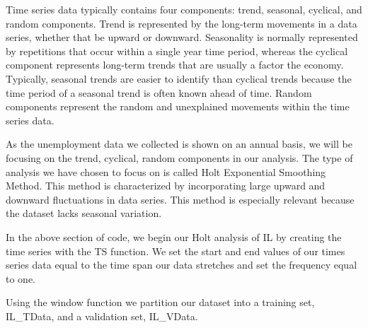 \documentclass[
]{article}
\newenvironment{Shaded}{\begin{snugshade}}{\end{snugshade}}
\newcommand{\CommentTok}[1]{\textcolor[rgb]{0.56,0.35,0.01}{\textit{#1}}}
\newcommand{\DataTypeTok}[1]{\textcolor[rgb]{0.13,0.29,0.53}{#1}}
\newcommand{\DecValTok}[1]{\textcolor[rgb]{0.00,0.00,0.81}{#1}}
\newcommand{\KeywordTok}[1]{\textcolor[rgb]{0.13,0.29,0.53}{\textbf{#1}}}
\newcommand{\NormalTok}[1]{#1}
\newcommand{\OperatorTok}[1]{\textcolor[rgb]{0.81,0.36,0.00}{\textbf{#1}}}
\newcommand{\StringTok}[1]{\textcolor[rgb]{0.31,0.60,0.02}{#1}}
\begin{document}
Time series data typically contains four components: trend, seasonal,
cyclical, and random components. Trend is represented by the long-term
movements in a data series, whether that be upward or downward.
Seasonality is normally represented by repetitions that occur within a
single year time period, whereas the cyclical component represents
long-term trends that are usually a factor the economy. Typically,
seasonal trends are easier to identify than cyclical trends because the
time period of a seasonal trend is often known ahead of time. Random
components represent the random and unexplained movements within the
time series data.

As the unemployment data we collected is shown on an annual basis, we
will be focusing on the trend, cyclical, random components in our
analysis. The type of analysis we have chosen to focus on is called Holt
Exponential Smoothing Method. This method is characterized by
incorporating large upward and downward fluctuations in data series.
This method is especially relevant because the dataset lacks seasonal
variation.

\begin{Shaded}
\end{Shaded}

In the above section of code, we begin our Holt analysis of IL by
creating the time series with the TS function. We set the start and end
values of our times series data equal to the time span our data
stretches and set the frequency equal to one.

Using the window function we partition our dataset into a training set,
IL\_TData, and a validation set, IL\_VData.
\end{document}

